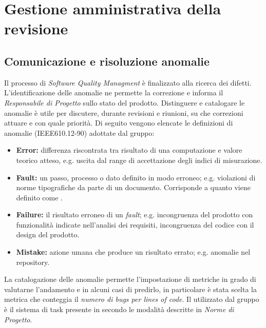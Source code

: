 \clearpage
\section{Gestione amministrativa della revisione}
	\subsection{Comunicazione e risoluzione anomalie}
	\label{D}
	Il processo di \emph{Software Quality Managment} è finalizzato alla ricerca dei difetti. L'identificazione delle anomalie ne permette la correzione e informa il \emph{Responsabile di Progetto} sullo stato del prodotto. Distinguere e catalogare le anomalie è utile per discutere, durante revisioni e riunioni, su che correzioni attuare e con quale priorità. Di seguito vengono elencate le definizioni di anomalie (IEEE610.12-90) adottate dal gruppo:
	\begin{itemize}
		\item \textbf{Error:} differenza riscontrata tra risultato di una computazione e valore teorico atteso, e.g. uscita dal range di accettazione degli indici di misurazione.
		\item \textbf{Fault:} un passo, processo o dato definito in modo erroneo; e.g. violazioni di norme tipografiche da parte di un documento. Corrisponde a quanto viene definito come .
		\item \textbf{Failure:} il risultato erroneo di un \emph{fault}; e.g. incongruenza del prodotto con funzionalità indicate nell'analisi dei requisiti, incongruenza del codice con il design del prodotto.
		\item \textbf{Mistake:} azione umana che produce un risultato errato; e.g. anomalie nel repository.
	\end{itemize}
	La catalogazione delle anomalie permette l'impostazione di metriche in grado di valutarne l'andamento e in alcuni casi di predirlo, in particolare è stata scelta la metrica che conteggia il \emph{numero di bugs per lines of code}. Il  utilizzato dal gruppo è il sistema di task presente in   secondo le modalità descritte in \emph{Norme di Progetto}.


